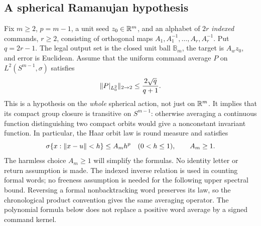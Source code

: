 \subsection{A spherical Ramanujan hypothesis}
Fix $m\ge2$, $p=m-1$, a unit seed $z_0\in\mathbb R^m$, and an alphabet
of $2r$ \emph{indexed} commands, $r\ge2$, consisting of orthogonal
maps $A_1,A_1^{-1},\ldots,A_r,A_r^{-1}$. Put $q=2r-1$.
The legal output set is the closed unit ball $\mathbb B_m$, the target is
$A_wz_0$, and error is Euclidean. Assume that the uniform command
average $P$ on $L^2(S^{m-1},\sigma)$ satisfies
\begin{equation}\label{eq:ramanujan63}
 \lVert P|_{L^2_0}\rVert_{2\to2}\le\frac{2\sqrt q}{q+1}.
\end{equation}
This is a hypothesis on the \emph{whole} spherical action, not just on
$\mathbb R^m$. It implies that its compact group closure is transitive on
$S^{m-1}$: otherwise averaging a continuous function distinguishing
two compact orbits would give a nonconstant invariant function.
In particular, the Haar orbit law is round measure and satisfies
\begin{equation}\label{eq:roundcap63}
 \sigma\{x:\lVert x-u\rVert<h\}\le A_m h^p\quad(0<h\le1),
 \qquad A_m\ge1.
\end{equation}
The harmless choice $A_m\ge1$ will simplify the formulas. No identity
letter or return assumption is made. The indexed inverse relation is
used in counting formal words; no freeness assumption is needed for
the following upper spectral bound. Reversing a formal nonbacktracking
word preserves its law, so the chronological product convention gives
the same averaging operator. The polynomial formula below does not
replace a positive word average by a signed command kernel.

